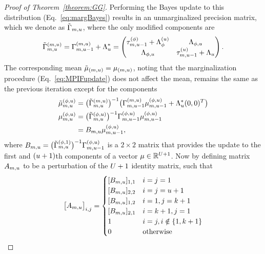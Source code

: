 \begin{proof}[Proof of Theorem~\ref{theorem:GG}]
Performing the Bayes update to this distribution (Eq.~\ref{eq:margBayes}) results in an unmarginalized precision matrix, which we denote as $\tilde{\Gamma}_{m, u}$, where the only modified components are
$$
\tilde{\Gamma}^{(m, u)}_{m, u} = \Gamma^{(m, u)}_{m, u-1} + \Lambda_u^* = \begin{pmatrix}
  \tau^{(\phi)}_{m, u-1} + \Lambda^{(u)}_{\phi} & \Lambda_{\phi, u} \\ 
  \Lambda_{\phi, u} & \tau^{(u)}_{m, u-1} + \Lambda_{u}
\end{pmatrix}. 
$$
The corresponding mean $\tilde{\mu}_{(m, u)} = \mu_{(m, u)}$, noting that the marginalization procedure (Eq.~\ref{eq:MPIFupdate}) does not affect the mean, remains the same as the previous iteration except for the components
\begin{align}
\begin{split}
    \tilde{\mu}^{(\phi, u)}_{m, u} &= \big(\tilde{\Gamma}^{(m, u)}_{m, u}\big)^{-1}\big(\Gamma^{(m, u)}_{m, u-1} \mu_{m, u-1}^{(\phi, u)} + \Lambda_u^* (0, 0)^T\big) \\
   \mu^{(\phi, u)}_{m, u} &= \big(\tilde{\Gamma}^{(\phi, u)}_{m, u}\big)^{-1}\Gamma^{(\phi, u)}_{m, u-1} \mu_{m, u-1}^{(\phi, u)} \\
   &= B_{m, u} \mu_{m, u-1}^{(\phi, u)}, 
\end{split}\label{eq:submatB}
\end{align}
where $B_{m, u} = \big(\tilde{\Gamma}^{(\phi, 1)}_{m, u}\big)^{-1}\Gamma^{(\phi, u)}_{m, u-1}$ is a $2\times 2$ matrix that provides the update to the first and $(u+1)$th components of a vector $\mu \in \mathbb{R}^{U+1}$.
Now by defining matrix $A_{m, u}$ to be a perturbation of the $U+1$ identity matrix, such that
\begin{equation*}
\big[A_{\nmif, \unit}\big]_{i, j} = \begin{cases}
  [B_{\nmif, \unit}]_{1, 1} & i = j = 1 \\
  [B_{\nmif, \unit}]_{2, 2} & i = j = u+1 \\
  [B_{\nmif, \unit}]_{1, 2} & i = 1, j = k+1 \\
  [B_{\nmif, \unit}]_{2, 1} & i = k+1, j = 1 \\
  1 & i = j, i \notin \{1, k+1\} \\
  0 & \text{otherwise}

\end{cases}
\end{equation*}
\end{proof}

